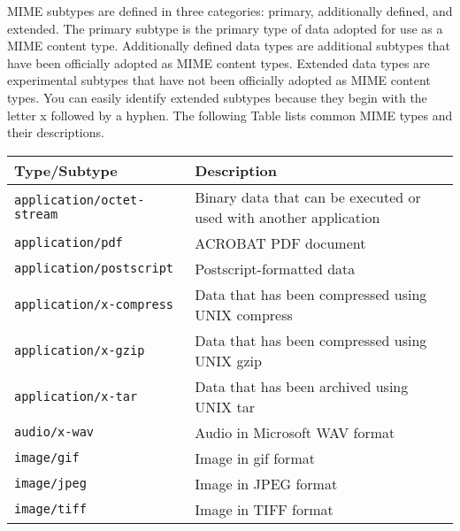 \begin{description}
MIME subtypes are defined in three categories: primary, additionally defined,
and extended. The primary subtype is the primary type of data adopted for use
as a MIME content type. Additionally defined data types are additional subtypes
that have been officially adopted as MIME content types. Extended data types
are experimental subtypes that have not been officially adopted as MIME content
types. You can easily identify extended subtypes because they begin with the
letter x followed by a hyphen. The following Table lists common MIME types and
their descriptions.
\begin{center}
\begin{longtable}{|l|p{8cm}|}
\hline
{\bf Type/Subtype} & {\bf Description}\\\hline 
\verb|application/octet-stream| & Binary data that can be executed or used with another application\\\hline 
\verb|application/pdf| & ACROBAT PDF document\\\hline 
\verb|application/postscript| & Postscript-formatted data\\\hline
\verb|application/x-compress| & Data that has been compressed using UNIX 
compress\\\hline
\verb|application/x-gzip| & Data that has been compressed using UNIX gzip\\\hline
\verb|application/x-tar| & Data that has been archived using UNIX tar\\\hline
\verb|audio/x-wav| & Audio in Microsoft WAV format\\\hline
\verb|image/gif| & Image in gif format\\\hline
\verb|image/jpeg| & Image in JPEG format\\\hline
\verb|image/tiff| & Image in TIFF format\\\hline

\end{longtable}
\end{center}
\end{description}
